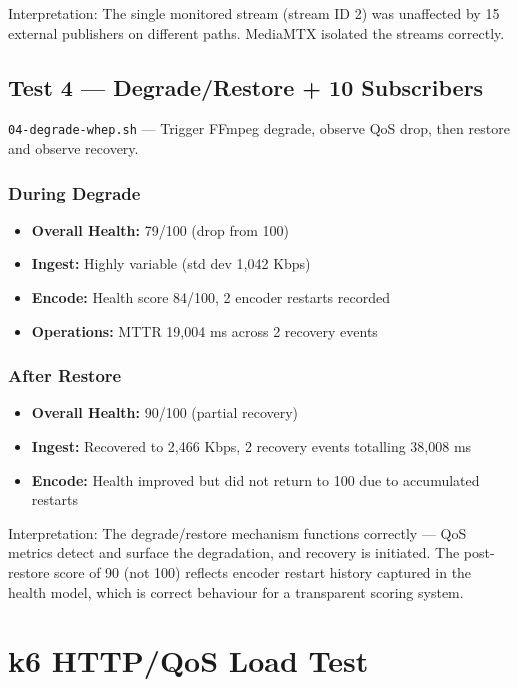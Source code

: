 \documentclass[a4paper,11pt]{article}
\begin{document}
Interpretation: The single monitored stream (stream ID 2) was unaffected by 15 external publishers on different paths. MediaMTX isolated the streams correctly.

\subsection{Test 4 --- Degrade/Restore + 10 Subscribers}

\texttt{04-degrade-whep.sh} --- Trigger FFmpeg degrade, observe QoS drop, then restore and observe recovery.

\subsubsection{During Degrade}
\begin{itemize}
  \item \textbf{Overall Health:} 79/100 (drop from 100)
  \item \textbf{Ingest:} Highly variable (std dev 1,042 Kbps)
  \item \textbf{Encode:} Health score 84/100, 2 encoder restarts recorded
  \item \textbf{Operations:} MTTR 19,004 ms across 2 recovery events
\end{itemize}

\subsubsection{After Restore}
\begin{itemize}
  \item \textbf{Overall Health:} 90/100 (partial recovery)
  \item \textbf{Ingest:} Recovered to 2,466 Kbps, 2 recovery events totalling 38,008 ms
  \item \textbf{Encode:} Health improved but did not return to 100 due to accumulated restarts
\end{itemize}

Interpretation: The degrade/restore mechanism functions correctly --- QoS metrics detect and surface the degradation, and recovery is initiated. The post-restore score of 90 (not 100) reflects encoder restart history captured in the health model, which is correct behaviour for a transparent scoring system.

\section{k6 HTTP/QoS Load Test}
\end{document}
